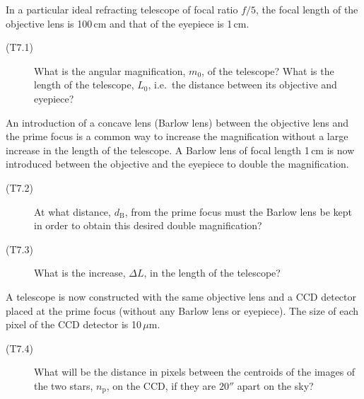 In a particular ideal refracting telescope of focal ratio $f/5$, the focal
length of the objective lens is 100\,cm and that of the eyepiece is 1\,cm.

\begin{description}
\item[(T7.1)] What is the angular magnification, $m_0$, of the telescope? What
  is the length of the telescope, $L_0$, i.e.\ the distance between its
  objective and eyepiece?
\end{description}

An introduction of a concave lens (Barlow lens) between the objective lens and
the prime focus is a common way to increase the magnification without a large
increase in the length of the telescope. A Barlow lens of focal length 1\,cm is
now introduced between the objective and the eyepiece to double the
magnification.

\begin{description}
\item[(T7.2)] At what distance, $d_{\mathrm{B}}$, from the prime focus must the
  Barlow lens be kept in order to obtain this desired double magnification?
\item[(T7.3)] What is the increase, $\Delta L$, in the length of the telescope?
\end{description}

A telescope is now constructed with the same objective lens and a CCD detector
placed at the prime focus (without any Barlow lens or eyepiece). The size of
each pixel of the CCD detector is 10\,$\mu$m.

\begin{description}
\item[(T7.4)] What will be the distance in pixels between the centroids of the
  images of the two stars, $n_{\mathrm{p}}$, on the CCD, if they are $20''$
  apart on the sky?
\end{description}
